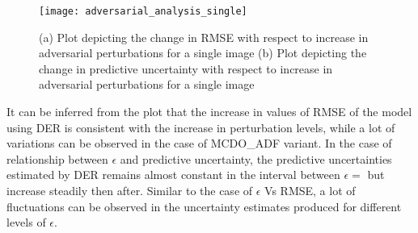 \begin{figure}[h]
	\centering
	\texttt{[image: adversarial\_analysis\_single]}
	\caption{(a) Plot depicting the change in RMSE with respect to increase in adversarial perturbations for a single image (b) Plot depicting the change in predictive uncertainty with respect to increase in adversarial perturbations for a single image}
	\label{fig_adv_analysis_single}
\end{figure}



It can be inferred from the plot that the increase in values of RMSE of the model using DER is consistent with the increase in perturbation levels, while a lot of variations can be observed in the case of MCDO\_ADF variant. In the case of relationship between $\epsilon$ and predictive uncertainty, the predictive uncertainties estimated by DER remains almost constant in the interval between $\epsilon = $ but increase steadily then after. Similar to the case of $\epsilon$ Vs RMSE, a lot of fluctuations can be observed in the uncertainty estimates produced for different levels of $\epsilon$.


